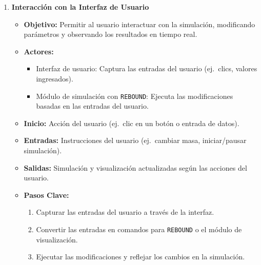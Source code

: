 \begin{enumerate}
    \item \textbf{Interacción con la Interfaz de Usuario}
        \begin{itemize}
            \item \textbf{Objetivo:} Permitir al usuario interactuar con la simulación, modificando parámetros y observando los resultados en tiempo real.
            \item \textbf{Actores:}
                \begin{itemize}
                    \item Interfaz de usuario: Captura las entradas del usuario (ej.\ clics, valores ingresados).
                    \item Módulo de simulación con \texttt{REBOUND}: Ejecuta las modificaciones basadas en las entradas del usuario.
                \end{itemize}
            \item \textbf{Inicio:} Acción del usuario (ej.\ clic en un botón o entrada de datos).
            \item \textbf{Entradas:} Instrucciones del usuario (ej.\ cambiar masa, iniciar/pausar simulación).
            \item \textbf{Salidas:} Simulación y visualización actualizadas según las acciones del usuario.
            \item \textbf{Pasos Clave:}
                \begin{enumerate}
                    \item Capturar las entradas del usuario a través de la interfaz.
                    \item Convertir las entradas en comandos para \texttt{REBOUND} o el módulo de visualización.
                    \item Ejecutar las modificaciones y reflejar los cambios en la simulación.
                \end{enumerate}
        \end{itemize}
\end{enumerate}

